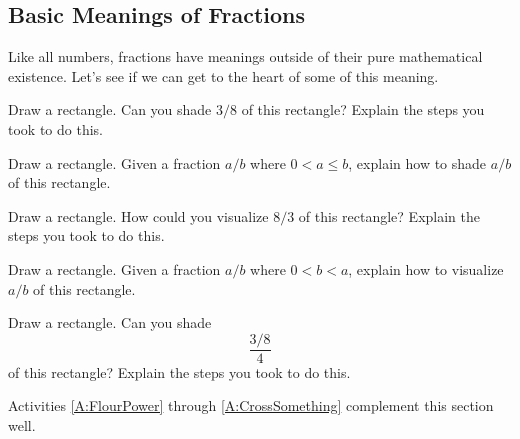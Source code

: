 \subsection{Basic Meanings of Fractions}

Like all numbers, fractions have meanings outside of their pure
mathematical existence. Let's see if we can get to the heart of some
of this meaning.

\begin{question}
Draw a rectangle. Can you shade $3/8$ of this rectangle? Explain the
steps you took to do this.
\end{question}
\QM



\begin{question}
Draw a rectangle. Given a fraction $a/b$ where $0< a\le b$, explain how
to shade $a/b$ of this rectangle.
\end{question}
\QM


\begin{question}
Draw a rectangle. How could you visualize $8/3$ of this rectangle?
Explain the steps you took to do this.
\end{question}
\QM


\begin{question}
Draw a rectangle. Given a fraction $a/b$ where $0< b< a$, explain how
to visualize $a/b$ of this rectangle.
\end{question}
\QM

\begin{question}
Draw a rectangle.  Can you shade
\[
\frac{3/8}{4}
\]
of this rectangle? Explain the steps you took to do this.
\end{question}
\QM


\begin{activitynote}
Activities \ref{A:FlourPower} through \ref{A:CrossSomething} complement this section well. 
\end{activitynote}


\newpage

